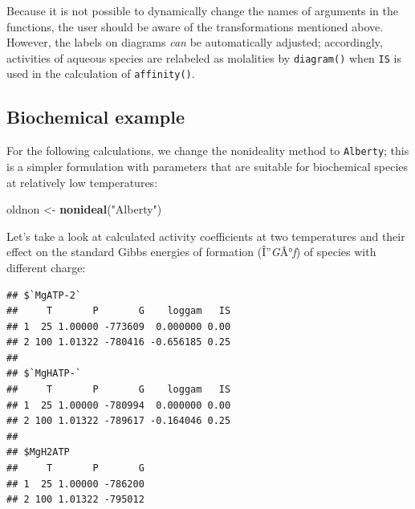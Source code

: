 \documentclass[]{tufte-handout}
\newenvironment{Shaded}{}{}
\newcommand{\KeywordTok}[1]{\textcolor[rgb]{0.00,0.44,0.13}{\textbf{#1}}}
\newcommand{\DataTypeTok}[1]{\textcolor[rgb]{0.56,0.13,0.00}{#1}}
\newcommand{\DecValTok}[1]{\textcolor[rgb]{0.25,0.63,0.44}{#1}}
\newcommand{\FloatTok}[1]{\textcolor[rgb]{0.25,0.63,0.44}{#1}}
\newcommand{\StringTok}[1]{\textcolor[rgb]{0.25,0.44,0.63}{#1}}
\newcommand{\OperatorTok}[1]{\textcolor[rgb]{0.40,0.40,0.40}{#1}}
\newcommand{\NormalTok}[1]{#1}
\begin{document}
Because it is not possible to dynamically change the names of arguments
in the functions, the user should be aware of the transformations
mentioned above. However, the labels on diagrams \emph{can} be
automatically adjusted; accordingly, activities of aqueous species are
relabeled as molalities by {\texttt{diagram()}} when \texttt{IS} is used
in the calculation of {\texttt{affinity()}}.

\subsection{Biochemical example}\label{biochemical-example}

For the following calculations, we change the nonideality method to
\texttt{Alberty}; this is a simpler formulation with parameters that are
suitable for biochemical species at relatively low temperatures:

\begin{Shaded}
\begin{Highlighting}[]
\NormalTok{oldnon <-}\StringTok{ }\KeywordTok{nonideal}\NormalTok{(}\StringTok{"Alberty"}\NormalTok{)}
\end{Highlighting}
\end{Shaded}

Let's take a look at calculated activity coefficients at two
temperatures and their effect on the standard Gibbs energies of
formation (Î''\emph{G}Â°\emph{f}) of species with different charge:

\begin{Shaded}
\end{Shaded}

\begin{verbatim}
## $`MgATP-2`
##     T       P       G    loggam   IS
## 1  25 1.00000 -773609  0.000000 0.00
## 2 100 1.01322 -780416 -0.656185 0.25
## 
## $`MgHATP-`
##     T       P       G    loggam   IS
## 1  25 1.00000 -780994  0.000000 0.00
## 2 100 1.01322 -789617 -0.164046 0.25
## 
## $MgH2ATP
##     T       P       G
## 1  25 1.00000 -786200
## 2 100 1.01322 -795012
\end{verbatim}
\end{document}
